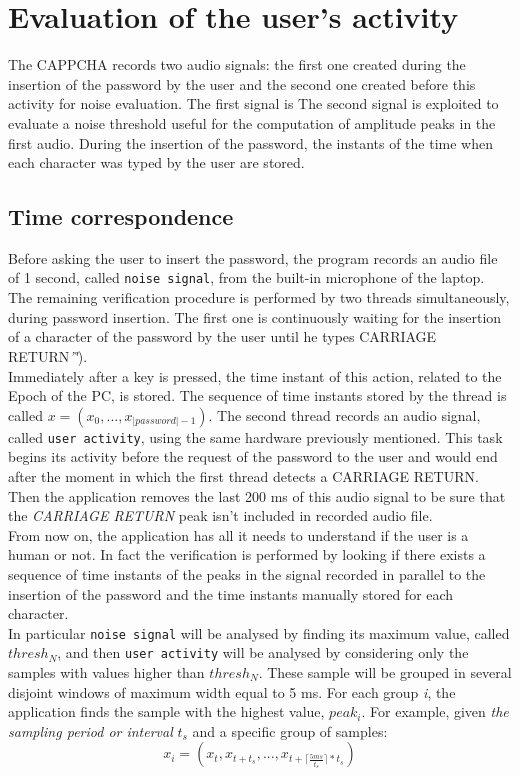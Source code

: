 \section{Evaluation of the user's activity}\label{AcCAPPCHA:user_activity}
The CAPPCHA records two audio signals: the first one created during the insertion of the password by the user and the second one created before this activity for noise evaluation. The first signal is The second signal is exploited to evaluate a noise threshold useful for the computation of amplitude peaks in the first audio.
During the insertion of the password, the instants of the time when each character was typed by the user are stored. 

\subsection{Time correspondence}\label{AcCAPPCHA:time_correspondence}
Before asking the user to insert the password, the program records an audio file of 1 second, called \texttt{noise signal}, from the built-in microphone of the laptop. The remaining verification procedure is performed by two threads simultaneously, during password insertion. The first one is continuously waiting for the insertion of a character of the password by the user until he types CARRIAGE RETURN\textit{'\r'}).\\
Immediately after a key is pressed, the time instant of this action, related to the Epoch of the PC, is stored. The sequence of time instants stored by the thread is called $x=(x_0, ..., x_{|password|-1})$. The second thread records an audio signal, called \texttt{user activity}, using the same hardware previously mentioned. This task begins its activity before the request of the password to the user and would end after the moment in which the first thread detects a CARRIAGE RETURN. Then the application removes the last 200 ms of this audio signal to be sure that the \textit{CARRIAGE RETURN} peak isn't included in recorded audio file.\\
From now on, the application has all it needs to understand if the user is a human or not. In fact the verification is performed by looking if there exists a sequence of time instants of the peaks in the signal recorded in parallel to the insertion of the password and the time instants manually stored for each character.\\
In particular \texttt{noise signal} will be analysed by finding its maximum value, called $thresh_N$, and then \texttt{user activity} will be analysed by considering only the samples with values higher than $thresh_N$. These sample will be grouped in several disjoint windows of maximum width equal to 5 ms. For each group \textit{i}, the application finds the sample with the highest value, $peak_i$. For example, given \textit{the sampling period or interval} $t_s$ and a specific group of samples: $$x_i = (x_t, x_{t+t_s}, ..., x_{t+\lceil \frac{5ms}{t_s}\rceil * t_s})$$
